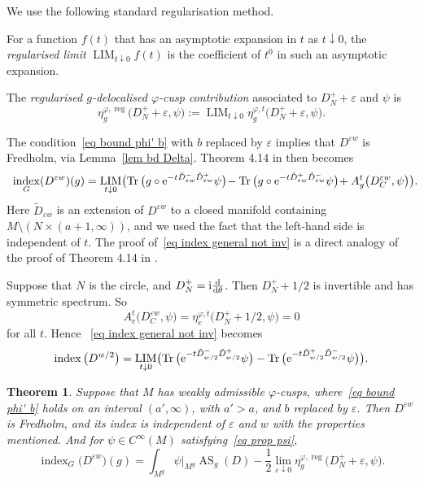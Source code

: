 \documentclass[pdftex]{sigma}%
\numberwithin{equation}{section}
\newtheorem{Theorem}{Theorem}[section]
\DeclareMathOperator{\Tr}{Tr}
\DeclareMathOperator{\AS}{AS}
\DeclareMathOperator{\ind}{index}
\DeclareMathOperator{\reg}{reg}
\DeclareMathOperator{\LIM}{LIM}
\begin{document}
We use the following standard regularisation method.
\begin{Definition}
For a function $f(t)$ that has an asymptotic expansion in $t$ as $t \downarrow 0$, the \emph{regularised limit} $\LIM_{t \downarrow 0}f(t)$ is
the coefficient of $t^0$ in such an asymptotic expansion.

The \emph{regularised $g$-delocalised $\varphi$-cusp contribution} associated to $D_N^+ + \varepsilon$ and $\psi$ is
\[
\eta_g^{\varphi, \reg}\big(D_N^+ + \varepsilon, \psi\big) := \LIM_{t \downarrow 0} \eta_g^{\varphi, t}\big(D_N^+ + \varepsilon, \psi\big).
\]
\end{Definition}

 The condition~\eqref{eq bound phi' b} with $b$ replaced by $\varepsilon$ implies that $D^{\varepsilon w}$ is Fredholm, via Lemma~\ref{lem bd Delta}.
Theorem 4.14 in \cite{HW21a} then becomes
 \begin{gather} \label{eq index general not inv}
 \ind_G(D^{\varepsilon w})(g) = \LIM_{t\downarrow 0} \bigl(
 \Tr\big(g\circ {\rm e}^{-t\tilde D^-_{\varepsilon w} \tilde D^+_{\varepsilon w}}\psi\big)\! - \Tr\big(g\circ {\rm e}^{-t\tilde D^+_{\varepsilon w} \tilde D^-_{\varepsilon w}}\psi\big)\! + A_{g}^t\big(D_C^{\varepsilon w}, \psi\big) \bigr).\!\!\!\!
 \end{gather}
 Here $\tilde D_{\varepsilon w}$ is an extension of $D^{\varepsilon w}$ to a closed manifold containing $M \setminus (N \times (a+1, \infty))$,
and we used the fact that the left-hand side is independent of $t$. The proof of~\eqref{eq index general not inv} is a direct analogy of the proof of Theorem 4.14 in \cite{HW21a}.
 \begin{Example}
 Suppose that $N$ is the circle, and $D_N^+ = {\rm i}\frac{{\rm d}}{{\rm d}\theta}$. Then $D_N^+ + 1/2$ is invertible and has symmetric spectrum.
 So
 \[
 A_{e}^t\big(D_C^{\varepsilon w}, \psi\big) = \eta^{\varphi, t}_{e}\big(D_N^++1/2, \psi\big) = 0
 \]
 for all $t$. Hence
~\eqref{eq index general not inv} becomes
 \[
 \ind\big(D^{w/2}\big) = \LIM_{t\downarrow 0} \bigl(
 \Tr\big({\rm e}^{-t\tilde D^-_{ w/2} \tilde D^+_{w/2}}\psi\big) - \Tr\big({\rm e}^{-t\tilde D^+_{w/2} \tilde D^-_{w/2}}\psi\big) \bigr).
 \]
 \end{Example}

\begin{Theorem}\label{thm index non invtble}
Suppose that $M$ has weakly admissible $\varphi$-cusps, where~\eqref{eq bound phi' b} holds on an interval $(a', \infty)$, with $a'>a$, and $b$ replaced by $\varepsilon$.
Then $D^{\varepsilon w}$ is Fredholm, and its index is independent of $\varepsilon$ and $w$ with the properties mentioned.
And for $\psi \in C^{\infty}(M)$ satisfying~\eqref{eq prop psi},
 \begin{equation} \label{eq index non invtble}
\ind_G\big(D^{\varepsilon w}\big)(g) = \int_{M^g} \psi|_{M^g} \AS_g(D)
-\frac{1}{2} \lim_{\varepsilon \downarrow 0}\eta^{\varphi, \reg}_g\big(D_N^+ +\varepsilon, \psi\big).
\end{equation}
\end{Theorem}
\end{document}
